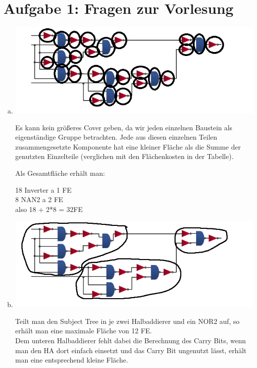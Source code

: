 \documentclass[a4paper]{scrartcl}
\begin{document}
	
	\section*{Aufgabe 1: Fragen zur Vorlesung}
	
	\begin{enumerate}[(a)]
		\item \hfill
		
		\includegraphics[scale=1]{1_subject_tree_max_cover}
		
		Es kann kein größeres Cover geben, da wir jeden einzelnen Baustein als eigenständige Gruppe betrachten. Jede aus diesen einzelnen Teilen zusammengesetzte Komponente hat eine kleiner Fläche als die Summe der genutzten Einzelteile (verglichen mit den Flächenkosten in der Tabelle).
		
		Als Gesamtfläche erhält man:
		
		18 Inverter a 1 FE\\
		8 NAN2 a 2 FE\\
		
		also 18 + 2*8 = 32FE
		
		\item \hfill
		
		\includegraphics[scale=1]{1_subject_tree_12_cover}
		
		Teilt man den Subject Tree in je zwei Halbaddierer und ein NOR2 auf, so erhält man eine maximale Fläche von 12 FE.\\
		
		Dem unteren Halbaddierer fehlt dabei die Berechnung des Carry Bits, wenn man den HA dort einfach einsetzt und das Carry Bit ungenutzt lässt, erhält man eine entsprechend kleine Fläche.
		

\end{enumerate}
\end{document}
